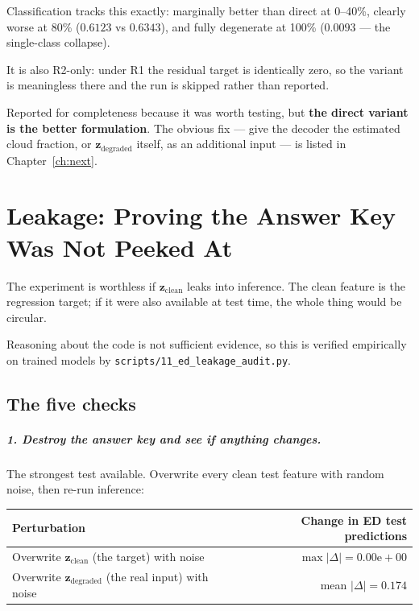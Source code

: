 \documentclass[11pt,a4paper]{report}
\newcommand{\file}[1]{\texttt{\small #1}}
\newcommand{\zc}{\mathbf{z}_{\text{clean}}}
\newcommand{\zd}{\mathbf{z}_{\text{degraded}}}
\begin{document}
Classification tracks this exactly: marginally better than direct at 0--40\%,
clearly worse at 80\% ($0.6123$ vs $0.6343$), and fully degenerate at 100\%
($0.0093$ --- the single-class collapse).

It is also R2-only: under R1 the residual target is identically zero, so the
variant is meaningless there and the run is skipped rather than reported.

\begin{whybox}
Reported for completeness because it was worth testing, but \textbf{the direct
variant is the better formulation}. The obvious fix --- give the decoder the
estimated cloud fraction, or $\zd$ itself, as an additional input --- is listed
in Chapter~\ref{ch:next}.
\end{whybox}

\chapter{Leakage: Proving the Answer Key Was Not Peeked At}
\label{ch:leak}

The experiment is worthless if $\zc$ leaks into inference. The clean feature is
the regression target; if it were also available at test time, the whole thing
would be circular.

Reasoning about the code is not sufficient evidence, so this is verified
empirically on trained models by \file{scripts/11\_ed\_leakage\_audit.py}.

\section{The five checks}

\paragraph{1. Destroy the answer key and see if anything changes.}
The strongest test available. Overwrite every clean test feature with random
noise, then re-run inference:

\begin{center}
\small
\begin{tabular}{@{}lr@{}}
\toprule
\textbf{Perturbation} & \textbf{Change in ED test predictions} \\
\midrule
Overwrite $\zc$ (the target) with noise & $\max|\Delta| = 0.00\mathrm{e}{+}00$ \\
Overwrite $\zd$ (the real input) with noise & mean $|\Delta| = 0.174$ \\
\bottomrule
\end{tabular}
\end{center}
\end{document}
